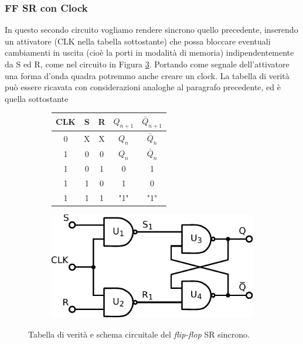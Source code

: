 \newpage
\subsubsection*{FF SR con Clock}


In questo secondo circuito vogliamo rendere sincrono quello precedente, inserendo un attivatore (CLK nella tabella sottostante) che possa bloccare eventuali cambiamenti in uscita (cioè la porti in modalità di memoria) indipendentemente da S ed R, come nel circuito in Figura \ref{cir11:FF-SR-s}.
Portando come segnale dell'attivatore una forma d'onda quadra potremmo anche creare un clock.
La tabella di verità può essere ricavata con considerazioni analoghe al paragrafo precedente, ed è quella sottostante

\begin{figure}[htpc]
\centering
	\begin{subfigure}[hc]{.4\textwidth}
		\centering
		{\renewcommand{\arraystretch}{1.2}%
		\begin{tabular}{|c||c|c|c|c|}
		\hline
		CLK & S & R & $Q_{n+1}$ & $\bar Q_{n+1}$  \\
		\hline \hline
		0 & X & X & $Q_n$ & $\bar Q_n$\\
		\hline \hline
		 1&0 & 0 & $Q_n$ & $\bar Q_n$\\
		\hline
		1&0 & 1 & 0 &1\\
		\hline
		1&1 & 0 & 1 & 0\\
		\hline
		1&1 & 1 & "1" & "1"\\
		\hline
		\end{tabular}}
		\caption{}
		\label{tab11:FFSR2}
        \end{subfigure}
        \begin{subfigure}[hc]{.4\textwidth}
		\centering
		\includegraphics[width=.7\textwidth]{../E11/latex/FF-SR-sync.pdf}
		\caption{}
		\label{cir11:FF-SR-s}
        \end{subfigure}
\caption{Tabella di verità e schema circuitale del \textit{flip-flop} SR sincrono.}
\end{figure}

